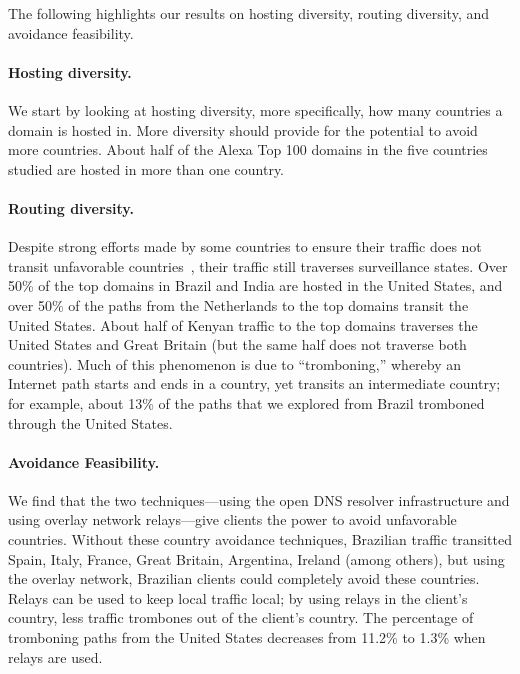 The following highlights our results on hosting diversity, routing diversity, and avoidance feasibility.

\paragraph{Hosting diversity.} We start by looking at hosting diversity, more specifically, how many
countries a domain is hosted in.  More diversity should provide for the
potential to avoid more countries.  About half of the
Alexa Top 100 domains in the five countries studied are hosted in more
than one country. 

\paragraph{Routing diversity.} Despite strong efforts made by some countries to ensure their traffic does 
not transit unfavorable countries~\cite{brazil_history, brazil_break_from_US, brazil_conference,
  brazil_conference2, brazil_human_rights},
their traffic still traverses surveillance states.  Over 50\% of the top domains in
Brazil and India are hosted in the United States, and over 50\% of the
paths from the Netherlands to the top domains transit the
United States.  About half of Kenyan traffic to the top domains traverses the United States
and Great Britain (but the same half does not traverse both countries).  Much of this phenomenon is
due to ``tromboning,'' whereby an Internet path starts and ends in a
country, yet transits an intermediate country; for example, about 13\%
of the paths that we explored from Brazil tromboned through the United States. 

\paragraph{Avoidance Feasibility.} We find that the two techniques---using the open DNS resolver 
infrastructure and using overlay network relays---give clients the power to avoid unfavorable countries.  Without these
country avoidance techniques, Brazilian traffic transitted Spain, Italy,
France, Great Britain, Argentina, Ireland (among others), but using the
overlay network, Brazilian clients could completely avoid these
countries.  Relays can be used to
keep local traffic local; by using relays in the client's country, less
traffic trombones out of the client's country.  The percentage of tromboning paths
from the United States decreases from 11.2\% to 1.3\% when
relays are used.   

